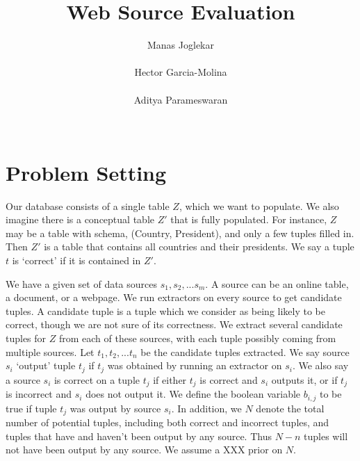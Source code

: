\documentclass{sig-alternate}
\begin{document}
\title{Web Source Evaluation}
\author{
\alignauthor
Manas Joglekar\\
       \\
\alignauthor
Hector Garcia-Molina\\
       \\
\alignauthor 
Aditya Parameswaran\\
       \\
}
\maketitle

\begin{abstract}
\end{abstract}

\section{Problem Setting}
Our database consists of a single table $Z$, which we want to populate. We also imagine there is a conceptual table $Z'$ that is fully populated. For instance, $Z$ may be a table with schema, (Country, President), and only a few tuples filled in. Then $Z'$ is a table that contains all countries and their presidents. We say a tuple $t$ is `correct' if it is contained in $Z'$. 

We have a given set of data sources $s_1, s_2, ... s_m$. A source can be an online table, a document, or a webpage. We run extractors on every source to get candidate tuples. A candidate tuple is a tuple which we consider as being likely to be correct, though we are not sure of its correctness. We extract several candidate tuples for $Z$ from each of these sources, with each tuple possibly coming from multiple sources. Let $t_1, t_2, ... t_n$ be the candidate tuples extracted. We say source $s_i$ `output' tuple $t_j$ if $t_j$ was obtained by running an extractor on $s_i$. We also say a source $s_i$ is correct on a tuple $t_j$ if either $t_j$ is correct and $s_i$ outputs it, or if $t_j$ is incorrect and $s_i$ does not output it. We define the boolean variable $b_{i,j}$ to be true if tuple $t_j$ was output by source $s_i$. In addition, we $N$ denote the total number of potential tuples, including both correct and incorrect tuples, and tuples that have and haven't been output by any source. Thus $N-n$ tuples will not have been output by any source. We assume a XXX prior on $N$.
\end{document}
